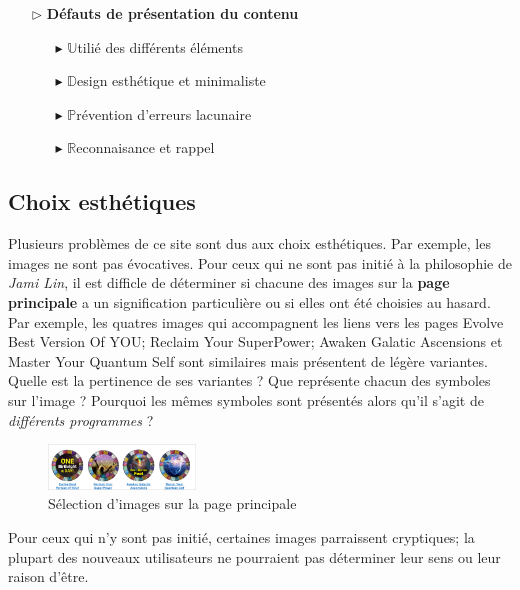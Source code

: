 \documentclass[9pt]{report}
\newcommand{\mathpazott}{\fontfamily{pplj}\selectfont}
\renewcommand{\texttt}[1]{{\scriptsize\mathpazott #1}}
\begin{document}
\begin{multicols*}{2}
  \begin{itemize}
    \item [$\rhd$ ] \textbf{Défauts de présentation du contenu}  
      \begin{itemize}
        \item [$\blacktriangleright$ ] $\mathbb{U}$tilié des différents éléments 
        \item [$\blacktriangleright$ ] $\mathbb{D}$esign esthétique et minimaliste 
        \item [$\blacktriangleright$ ] $\mathbb{P}$révention d'erreurs lacunaire
        \item [$\blacktriangleright$ ] $\mathbb{R}$econnaisance et rappel
      \end{itemize}
  \end{itemize}
  \vspace{-1em}


  \subsection{Choix esthétiques}
  Plusieurs problèmes de ce site sont dus aux choix esthétiques. 
  Par exemple, les images ne sont pas évocatives. Pour ceux qui ne sont pas 
  initié à la philosophie de \textit{\textit{Jami Lin}}, il est difficle de 
  déterminer si chacune des images sur la \textbf{page principale} a un signification 
  particulière ou si elles ont été choisies au hasard. Par exemple, 
  les quatres images qui accompagnent les liens vers les pages 
  \texttt{Evolve Best Version Of YOU}; \texttt{Reclaim Your SuperPower}; 
  \texttt{Awaken Galatic Ascensions} et \texttt{Master Your Quantum Self} sont 
  similaires mais présentent de légère variantes. Quelle est la pertinence 
  de ses variantes ?
  Que représente chacun des symboles sur l'image ? Pourquoi les mêmes 
  symboles sont présentés alors qu'il s'agit de \textit{différents programmes} ?   
  \begin{figure}[H]
    \begin{center}
      \includegraphics[width=0.35\textwidth]{ImagesConfondantes.png}
    \end{center}
    \caption{Sélection d'images sur la page principale}
  \end{figure}

  Pour ceux qui n'y sont pas initié, certaines images parraissent 
  cryptiques; la plupart des nouveaux utilisateurs ne pourraient pas 
  déterminer leur sens ou leur raison d'être. 


\end{multicols*}
\end{document}
